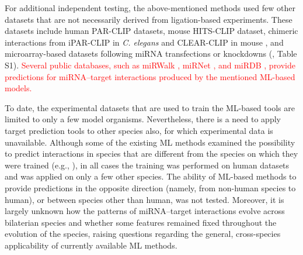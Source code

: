 \documentclass{bmcart}
\begin{document}
For additional independent testing, the above-mentioned methods used few other datasets that are not necessarily derived from ligation-based experiments. These datasets include human PAR-CLIP datasets, mouse HITS-CLIP dataset, chimeric interactions from iPAR-CLIP in \textit{C. elegans} and CLEAR-CLIP in mouse \cite{darnell_moore2015mirna}, and microarray-based datasets following miRNA transfections or knockdowns (, Table S1). 
\textcolor{red}{Several public databases, such as miRWalk \cite{dweep2015mirwalk2}, miRNet \cite{chang2020mirnet}, and miRDB \cite{chen2020mirdb}, provide predictions for miRNA--target interactions produced by the mentioned ML-based models.}

To date, the experimental datasets that are used to train the ML-based tools are limited to only a few model organisms. Nevertheless, there is a need to apply target prediction tools to other species also, for which experimental data is unavailable. Although some of the existing ML methods examined the possibility to predict interactions in species that are different from the species on which they were trained (e.g., \cite{lu2016learning,ding2016tarpmir,liu2019prediction}), in all cases the training was performed on human datasets and was applied on only a few other species. The ability of ML-based methods to provide predictions in the opposite direction (namely, from non-human species to human), or between species other than human, was not tested. Moreover, it is largely unknown how the patterns of miRNA--target interactions evolve across bilaterian species and whether some features remained fixed throughout the evolution of the species, raising questions regarding the general, cross-species applicability of currently available ML methods.  
\end{document}
